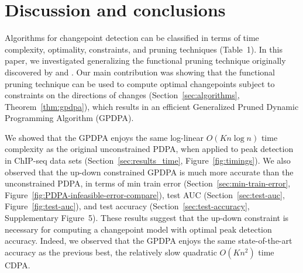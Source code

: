 \documentclass[twoside,11pt]{article}
\begin{document}
%   

\section{Discussion and conclusions}
\label{sec:discussion}

Algorithms for changepoint detection can be classified in terms of
time complexity, optimality, constraints, and pruning techniques
(Table~1). In this paper, we investigated generalizing the functional
pruning technique originally discovered by \citet{pruned-dp} and
\citet{phd-johnson}. Our main contribution was showing that the
functional pruning technique can be used to compute optimal
changepoints subject to constraints on the directions of changes
(Section~\ref{sec:algorithms}, Theorem~\ref{thm:gpdpa}), which results in
an efficient Generalized Pruned Dynamic Programming Algorithm (GPDPA).

We showed that the GPDPA enjoys the same log-linear $O(Kn\log n)$ time
complexity as the original unconstrained PDPA, when applied to peak
detection in ChIP-seq data sets (Section~\ref{sec:results_time},
Figure~\ref{fig:timings}). We also observed that the up-down
constrained GPDPA is much more accurate than the unconstrained PDPA,
in terms of min train error (Section~\ref{sec:min-train-error},
Figure~\ref{fig:PDPA-infeasible-error-compare}), test AUC
(Section~\ref{sec:test-auc}, Figure~\ref{fig:test-auc}), and test
accuracy (Section~\ref{sec:test-accuracy}, Supplementary
Figure~5). These results suggest that the up-down constraint is
necessary for computing a changepoint model with optimal peak
detection accuracy. Indeed, we observed that the GPDPA enjoys the same
state-of-the-art accuracy as the previous best, the relatively slow
quadratic $O(Kn^2)$ time CDPA.
\end{document}

